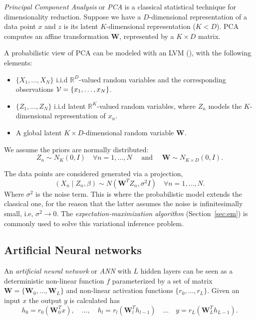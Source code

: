 \emph{Principal Component Analysis} or \emph{PCA} is a classical statistical technique for dimensionality reduction. Suppose we have a \(D\)-dimensional representation of a data point \(x\) and \(z\) is its latent \(K\)-dimensional representation (\(K < D\)). PCA computes an affine transformation \(\bm{W}\), represented by a \(K \times D\) matrix.

A probabilistic view of PCA can be modeled with an LVM (\cite{tipping1999probabilistic}), with the following elements:

\begin{itemize}
  \item \(\{X_{1},\dots,X_{N}\}\) i.i.d \(\mathbb{R}^{D}\)-valued random variables and the corresponding observations \(\mathcal{V} = \{x_{1},\dots, x_{N}\}\).
  \item \(\{Z_{1}, \dots, Z_{N}\}\) i.i.d latent \(\mathbb{R}^{K}\)-valued random variables, where \(Z_{n}\) models the \(K\)-dimensional representation of \(x_{n}\).
  \item A global latent \(K\times D\)-dimensional random variable \(\bm{W}\).
\end{itemize}

We assume the priors are normally distributed:
\[
  Z_{n} \sim N_{K}(0, I) \quad \forall n =1,\dots,N \quad \text{ and } \quad \bm{W} \sim N_{K\times D}(0, I).
\]

The data points are considered generated via a projection,
\[
  (X_{n} \mid Z_{n}, \beta) \sim N(\bm{W}^{T}Z_{n}, \sigma^{2}I)\quad \forall n = 1,\dots, N.
\]
Where \(\sigma^{2}\) is the noise term. This is where the probabilistic model extends the classical one, for the reason that the latter assumes the noise is infinitesimally small, i.e, \(\sigma^{2} \to 0\). The \emph{expectation-maximization algorithm} (Section~\ref{sec:em}) is commonly used to solve this variational inference problem.



\subsection{Artificial Neural networks}

An \emph{artificial neural network} or \emph{ANN} with \(L\) hidden layers can be seen as a deterministic non-linear function \(f\) parameterized by a set of matrix \(\bm{W} = \{\bm{W}_{0},\dots, \bm{W}_{L}\}\) and non-linear activation functions \(\{r_{0},\dots, r_{L}\}\). Given an input \(x\) the output \(y\) is calculated has
\[
  h_{0} = r_{0}(\bm{W}^{T}_{0}x), \quad \dots, \quad h_{l} = r_{l}(\bm{W}_{l}^{T}h_{l-1}) \quad \dots \quad y = r_{L}(\bm{W}_{L}^{T}h_{L-1}).
\]

